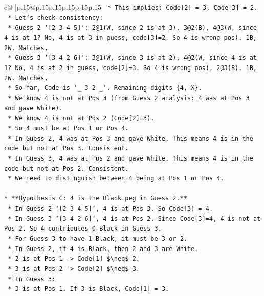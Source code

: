 \documentclass{article}
\begin{document}
{\begin{supertabular}{c@{$\;$}|p{.15\linewidth}@{}p{.15\linewidth}p{.15\linewidth}p{.15\linewidth}p{.15\linewidth}p{.15\linewidth}}
{{{\texttt{        *   This implies: Code{[}2{]} = 3, Code{[}3{]} = 2.} \\
\texttt{        *   Let's check consistency:} \\
\texttt{            *   Guess 2 `{[}2 3 4 5{]}`: 2@1(W, since 2 is at 3), 3@2(B), 4@3(W, since 4 is at 1? No, 4 is at 3 in guess, code{[}3{]}=2. So 4 is wrong pos). 1B, 2W. Matches.} \\
\texttt{            *   Guess 3 `{[}3 4 2 6{]}`: 3@1(W, since 3 is at 2), 4@2(W, since 4 is at 1? No, 4 is at 2 in guess, code{[}2{]}=3. So 4 is wrong pos), 2@3(B). 1B, 2W. Matches.} \\
\texttt{    *   So far, Code is `\_ 3 2 \_`. Remaining digits \{4, X\}.} \\
\texttt{    *   We know 4 is not at Pos 3 (from Guess 2 analysis: 4 was at Pos 3 and gave White).} \\
\texttt{    *   We know 4 is not at Pos 2 (Code{[}2{]}=3).} \\
\texttt{    *   So 4 must be at Pos 1 or Pos 4.} \\
\texttt{    *   In Guess 2, 4 was at Pos 3 and gave White. This means 4 is in the code but not at Pos 3. Consistent.} \\
\texttt{    *   In Guess 3, 4 was at Pos 2 and gave White. This means 4 is in the code but not at Pos 2. Consistent.} \\
\texttt{    *   We need to distinguish between 4 being at Pos 1 or Pos 4.} \\
\\ 
\texttt{*   **Hypothesis C: 4 is the Black peg in Guess 2.**} \\
\texttt{    *   In Guess 2 `{[}2 3 4 5{]}`, 4 is at Pos 3. So Code{[}3{]} = 4.} \\
\texttt{    *   In Guess 3 `{[}3 4 2 6{]}`, 4 is at Pos 2. Since Code{[}3{]}=4, 4 is not at Pos 2. So 4 contributes 0 Black in Guess 3.} \\
\texttt{    *   For Guess 3 to have 1 Black, it must be 3 or 2.} \\
\texttt{    *   In Guess 2, if 4 is Black, then 2 and 3 are White.} \\
\texttt{        *   2 is at Pos 1 {-}> Code{[}1{]} \$\textbackslash{}neq\$ 2.} \\
\texttt{        *   3 is at Pos 2 {-}> Code{[}2{]} \$\textbackslash{}neq\$ 3.} \\
\texttt{    *   In Guess 3:} \\
\texttt{        *   3 is at Pos 1. If 3 is Black, Code{[}1{]} = 3.} \\
}}}
\end{supertabular}}
\end{document}
